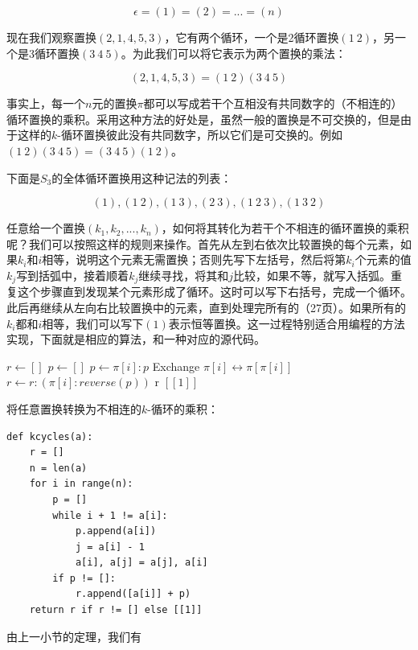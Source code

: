 \documentclass[b5paper]{ctexart}
\begin{document}
\[
\epsilon = (1) = (2) = ... = (n)
\]

现在我们观察置换$(2, 1, 4, 5, 3)$，它有两个循环，一个是2循环置换$(1\ 2)$，另一个是3循环置换$(3\ 4\ 5)$。为此我们可以将它表示为两个置换的乘法：

\[
(2, 1, 4, 5, 3) = (1\ 2)(3\ 4\ 5)
\]

事实上，每一个$n$元的置换$\pi$都可以写成若干个互相没有共同数字的（不相连的）循环置换的乘积。采用这种方法的好处是，虽然一般的置换是不可交换的，但是由于这样的$k$-循环置换彼此没有共同数字，所以它们是可交换的。例如$(1\ 2)(3\ 4\ 5) = (3\ 4\ 5)(1\ 2)$。

下面是$S_3$的全体循环置换用这种记法的列表：

\[
(1),
(1\ 2), (1\ 3), (2\ 3),
(1\ 2\ 3), (1\ 3\ 2)
\]

任意给一个置换$(k_1, k_2, ..., k_n)$，如何将其转化为若干个不相连的循环置换的乘积呢？我们可以按照这样的规则来操作。首先从左到右依次比较置换的每个元素，如果$k_i$和$i$相等，说明这个元素无需置换；否则先写下左括号，然后将第$k_i$个元素的值$k_j$写到括弧中，接着顺着$k_j$继续寻找，将其和$j$比较，如果不等，就写入括弧。重复这个步骤直到发现某个元素形成了循环。这时可以写下右括号，完成一个循环。此后再继续从左向右比较置换中的元素，直到处理完所有的\cite{Armstrong1988}（27页）。如果所有的$k_i$都和$i$相等，我们可以写下$(1)$表示恒等置换。这一过程特别适合用编程的方法实现，下面就是相应的算法，和一种对应的源代码。

\begin{algorithmic}
  \State $r \gets []$
    \State $p \gets []$
      \State $p \gets \pi[i]:p$
      \State Exchange $\pi[i] \leftrightarrow \pi[\pi[i]]$
    \EndWhile
      \State $r \gets r:(\pi[i]:reverse(p))$
    \EndIf
  \EndFor
    \State \Return r
  \Else
    \State \Return $[[1]]$ 
  \EndIf
\EndFunction
\end{algorithmic}

将任意置换转换为不相连的$k$-循环的乘积：
\lstset{language=Python}
\begin{lstlisting}
def kcycles(a):
    r = []
    n = len(a)
    for i in range(n):
        p = []
        while i + 1 != a[i]:
            p.append(a[i])
            j = a[i] - 1
            a[i], a[j] = a[j], a[i]
        if p != []:
            r.append([a[i]] + p)
    return r if r != [] else [[1]]
\end{lstlisting}

由上一小节的定理，我们有
\end{document}
